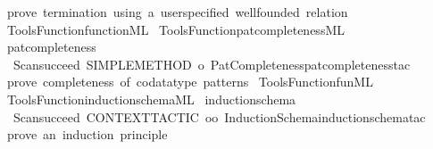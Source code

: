 \begin{isabellebody}
{\isacartoucheclose}\ {\isachardoublequoteopen}prove\ termination\ using\ a\ user{\isacharminus}{\kern0pt}specified\ wellfounded\ relation{\isachardoublequoteclose}\isanewline
\isanewline
{}\isamarkupfalse%
\ {\isacartoucheopen}Tools{\isacharslash}{\kern0pt}Function{\isacharslash}{\kern0pt}function{\isachardot}{\kern0pt}ML{\isacartoucheclose}\isanewline
{}\isamarkupfalse%
\ {\isacartoucheopen}Tools{\isacharslash}{\kern0pt}Function{\isacharslash}{\kern0pt}pat{\isacharunderscore}{\kern0pt}completeness{\isachardot}{\kern0pt}ML{\isacartoucheclose}\isanewline
\isanewline
{}\isamarkupfalse%
\ pat{\isacharunderscore}{\kern0pt}completeness\ {\isacharequal}{\kern0pt}\ {\isacartoucheopen}\isanewline
\ \ Scan{\isachardot}{\kern0pt}succeed\ {\isacharparenleft}{\kern0pt}SIMPLE{\isacharunderscore}{\kern0pt}METHOD{\isacharprime}{\kern0pt}\ o\ Pat{\isacharunderscore}{\kern0pt}Completeness{\isachardot}{\kern0pt}pat{\isacharunderscore}{\kern0pt}completeness{\isacharunderscore}{\kern0pt}tac{\isacharparenright}{\kern0pt}\isanewline
{\isacartoucheclose}\ {\isachardoublequoteopen}prove\ completeness\ of\ {\isacharparenleft}{\kern0pt}co{\isacharparenright}{\kern0pt}datatype\ patterns{\isachardoublequoteclose}\isanewline
\isanewline
{}\isamarkupfalse%
\ {\isacartoucheopen}Tools{\isacharslash}{\kern0pt}Function{\isacharslash}{\kern0pt}fun{\isachardot}{\kern0pt}ML{\isacartoucheclose}\isanewline
{}\isamarkupfalse%
\ {\isacartoucheopen}Tools{\isacharslash}{\kern0pt}Function{\isacharslash}{\kern0pt}induction{\isacharunderscore}{\kern0pt}schema{\isachardot}{\kern0pt}ML{\isacartoucheclose}\isanewline
\isanewline
{}\isamarkupfalse%
\ induction{\isacharunderscore}{\kern0pt}schema\ {\isacharequal}{\kern0pt}\ {\isacartoucheopen}\isanewline
\ \ Scan{\isachardot}{\kern0pt}succeed\ {\isacharparenleft}{\kern0pt}CONTEXT{\isacharunderscore}{\kern0pt}TACTIC\ oo\ Induction{\isacharunderscore}{\kern0pt}Schema{\isachardot}{\kern0pt}induction{\isacharunderscore}{\kern0pt}schema{\isacharunderscore}{\kern0pt}tac{\isacharparenright}{\kern0pt}\isanewline
{\isacartoucheclose}\ {\isachardoublequoteopen}prove\ an\ induction\ principle{\isachardoublequoteclose}%
\endisatagML
{\isafoldML}%
%
\isadelimML
%
\endisadelimML
%
\isadelimdocument
%
\endisadelimdocument
%
\isatagdocument
%
\end{isabellebody}
